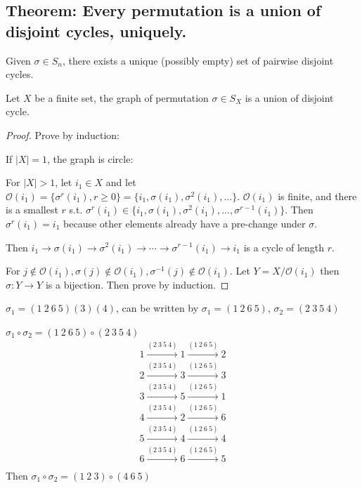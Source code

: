 \documentclass[11pt]{elegantbook}
\begin{document}
\subsection{Theorem: Every permutation is a union of disjoint
cycles, uniquely.}
Given $\sigma\in S_n$, there exists a unique (possibly empty) set of pairwise disjoint cycles.
\begin{theorem}
Let $X$ be a finite set, the graph of permutation $\sigma\in S_X$ is a union of disjoint cycle.
\end{theorem}
\begin{proof}
Prove by induction:

If $|X|=1$, the graph is circle:

For $|X|>1$, let $i_1\in X$ and let $\mathcal{O}(i_1)=\{\sigma^r(i_1),r\geq 0\}=\{i_1,\sigma(i_1),\sigma^2(i_1),...\}$. $\mathcal{O}(i_1)$ is finite, and there is a smallest $r$ s.t. $\sigma^r(i_1)\in\{i_1,\sigma(i_1),\sigma^2(i_1),...,\sigma^{r-1}(i_1)\}$. Then $\sigma^r(i_1)=i_1$ because other elements already have a pre-change under $\sigma$.

Then $i_1 \rightarrow \sigma(i_1) \rightarrow \sigma^2(i_1)\rightarrow \cdots \rightarrow \sigma^{r-1}(i_1) \rightarrow	i_1$ is a cycle of length $r$.

For $j\notin \mathcal{O}(i_1), \sigma(j)\notin \mathcal{O}(i_1), \sigma^{-1}(j)\notin \mathcal{O}(i_1)$. Let $Y=X/\mathcal{O}(i_1)$ then $\sigma: Y \rightarrow	Y$ is a bijection. Then prove by induction.

\end{proof}

\begin{example}
$\sigma_1=(1\ 2\ 6\ 5)(3)(4)$, can be written by $\sigma_1=(1\ 2\ 6\ 5)$, $\sigma_2=(2\ 3\ 5\ 4)$
\end{example}
$\sigma_1 \circ \sigma_2=(1\ 2\ 6\ 5)\circ (2\ 3\ 5\ 4)$
\begin{equation}
    \begin{aligned}
        1 \stackrel{(2\ 3\ 5\ 4)}{\longrightarrow} 1 \stackrel{(1\ 2\ 6\ 5)}{\longrightarrow} 2\\
        2 \stackrel{(2\ 3\ 5\ 4)}{\longrightarrow} 3 \stackrel{(1\ 2\ 6\ 5)}{\longrightarrow} 3\\
        3 \stackrel{(2\ 3\ 5\ 4)}{\longrightarrow} 5 \stackrel{(1\ 2\ 6\ 5)}{\longrightarrow} 1\\
        4 \stackrel{(2\ 3\ 5\ 4)}{\longrightarrow} 2 \stackrel{(1\ 2\ 6\ 5)}{\longrightarrow} 6\\
        5 \stackrel{(2\ 3\ 5\ 4)}{\longrightarrow} 4 \stackrel{(1\ 2\ 6\ 5)}{\longrightarrow} 4\\
        6 \stackrel{(2\ 3\ 5\ 4)}{\longrightarrow} 6 \stackrel{(1\ 2\ 6\ 5)}{\longrightarrow} 5\\
    \end{aligned}
    \nonumber
\end{equation}
Then $\sigma_1 \circ \sigma_2=(1\ 2\ 3)\circ (4\ 6\ 5)$
\end{document}
